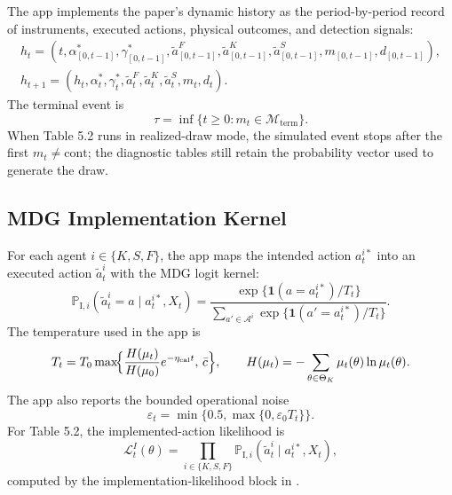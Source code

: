 \documentclass[ecta,nameyear,final,supplement]{econsocart}
\numberwithin{equation}{section}
\newcommand{\Prob}{\mathbb{P}}
\newcommand{\Ind}{\mathbf{1}}
\newcommand{\calA}{\mathcal{A}}
\newcommand{\ThetaK}{\Theta_K}
\newcommand{\LI}{\mathcal{L}^{I}}
\begin{document}
The app implements the paper's dynamic history as the period-by-period record
of instruments, executed actions, physical outcomes, and detection signals:
\begin{gather}
h_t=
\left(
t,\alpha^\ast_{[0,t-1]},\gamma^\ast_{[0,t-1]},
\widetilde a^F_{[0,t-1]},\widetilde a^K_{[0,t-1]},
\widetilde a^S_{[0,t-1]},m_{[0,t-1]},d_{[0,t-1]}
\right),\label{eq:app-history}\\
h_{t+1}=
\left(h_t,\alpha_t^\ast,\gamma_t^\ast,
\widetilde a_t^F,\widetilde a_t^K,\widetilde a_t^S,m_t,d_t\right).
\label{eq:app-history-update}
\end{gather}
The terminal event is
\begin{equation}
\tau=\inf\{t\ge0:m_t\in\mathcal M_{\mathrm{term}}\}.
\label{eq:app-stopping}
\end{equation}
When Table 5.2 runs in realized-draw mode, the simulated event stops after the
first $m_t\ne\mathrm{cont}$; the diagnostic tables still retain the probability
vector used to generate the draw.

\subsection{MDG Implementation Kernel}

For each agent $i\in\{K,S,F\}$, the app maps the intended action
$a_t^{i\ast}$ into an executed action $\widetilde a_t^i$ with the MDG logit
kernel:
\begin{equation}
\Prob_{\mathrm I,i}
\left(\widetilde a_t^i=a\mid a_t^{i\ast},X_t\right)
=
\frac{\exp\{\Ind(a=a_t^{i\ast})/T_t\}}
{\sum_{a'\in\calA^i}\exp\{\Ind(a'=a_t^{i\ast})/T_t\}}.
\label{eq:app-mdg}
\end{equation}
The temperature used in the app is
\begin{equation}
T_t
=
T_0\max\!\Bigl\{\frac{H(\mu_t)}{H(\mu_0)}e^{-\eta_{\mathrm{cal}}t},\,\bar c\Bigr\},
\qquad
H(\mu_t)=-\sum_{\theta\in\ThetaK}\mu_t(\theta)\ln\mu_t(\theta).
\label{eq:app-temperature}
\end{equation}
The app also reports the bounded operational noise
\begin{equation}
\varepsilon_t=\min\{0.5,\max\{0,\varepsilon_0T_t\}\}.
\label{eq:app-mdg-eps}
\end{equation}
For Table 5.2, the implemented-action likelihood is
\begin{equation}
\LI_t(\theta)
=
\prod_{i\in\{K,S,F\}}
\Prob_{\mathrm I,i}
\left(\widetilde a_t^i\mid a_t^{i\ast},X_t\right),
\label{eq:app-li}
\end{equation}
computed by the implementation-likelihood block in .
\end{document}
